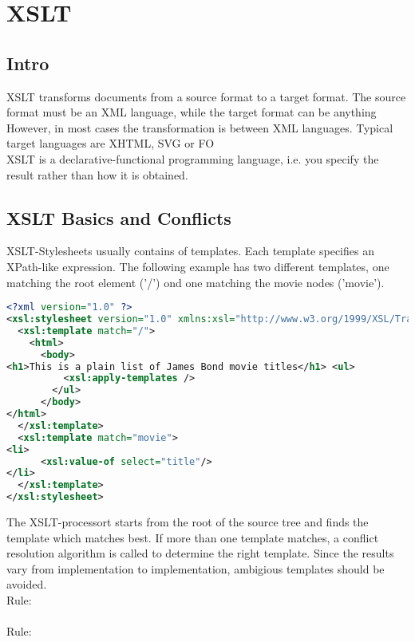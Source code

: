 \chapter{XSLT}
\section{Intro}
XSLT transforms documents from a source format to a target format. The source format must be an XML language, while the target format can be anything
However, in most cases the transformation is between XML languages. Typical target languages are XHTML, SVG or FO\\
XSLT is a declarative-functional programming language, i.e. you specify the result rather than how it is obtained.
\section{XSLT Basics and Conflicts}
XSLT-Stylesheets usually contains of templates. Each template specifies an XPath-like expression.
The following example has two different templates, one matching the root element ('/') ond one matching the movie nodes ('movie').
\begin{lstlisting}[language=XML]
<?xml version="1.0" ?>
<xsl:stylesheet version="1.0" xmlns:xsl="http://www.w3.org/1999/XSL/Transform">
  <xsl:template match="/">
    <html>
      <body>
<h1>This is a plain list of James Bond movie titles</h1> <ul>
          <xsl:apply-templates />
        </ul>
      </body>
</html>
  </xsl:template>
  <xsl:template match="movie">
<li>
      <xsl:value-of select="title"/>
</li>
  </xsl:template>
</xsl:stylesheet>
\end{lstlisting}
The XSLT-processort starts from the root of the source tree and finds the template which matches best. If more than one template matches,
a conflict resolution algorithm is called to determine the right template. Since the results vary from implementation to implementation,
ambigious templates should be avoided.\\
Rule:\\
\\
Rule:\\

